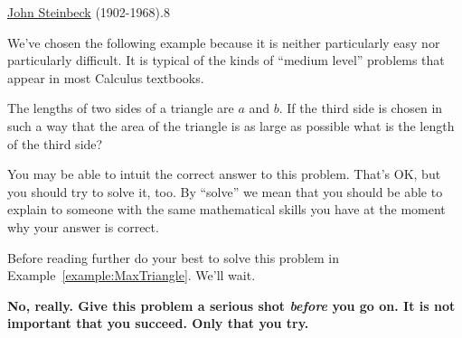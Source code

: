 
{\href{https://www.nobelprize.org/prizes/literature/1962/steinbeck/biographical/}{John Steinbeck} (1902-1968)}{.8}




  
We've chosen the following example because it is neither particularly
easy nor particularly difficult. It is typical of the kinds of
``medium level'' problems that appear in most Calculus textbooks.

\begin{myexample}{}
  \label{example:MaxTriangle}
  The lengths of two sides of a triangle are $a$ and $b.$ If the third
  side is chosen in such a way that the area of the triangle is as
  large as possible what is the length of the third side?
\end{myexample}



You may be able to intuit the correct answer to this problem. That's
OK, but you should try to solve it, too. By ``solve'' we mean that you
should be able to explain to someone with the same mathematical skills
you have at the moment why your answer is correct.

Before reading
further do your best to solve this problem in Example~\ref{example:MaxTriangle}. We'll wait.
\begin{center}
  \begin{minipage}{.8\linewidth}
    \vfill{} {\large\bf{} No, really. Give this problem a serious shot
      \emph{before} you go on. It is not important that you
      succeed. Only that you try.}
  \end{minipage}
\end{center}
\vfill{}

